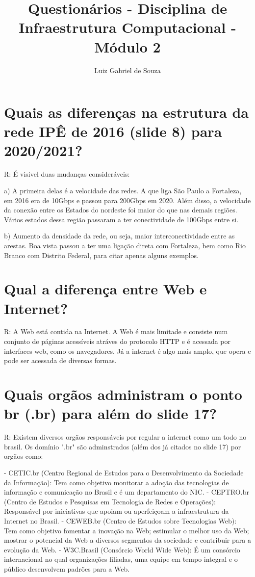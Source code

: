 \documentclass{article}
\title{Questionários - Disciplina de Infraestrutura Computacional - Módulo 2}
\author{Luiz Gabriel de Souza}
\begin{document}
\maketitle


\section{Quais as diferenças na estrutura da rede IPÊ de 2016 (slide 8) para 2020/2021?}
R: É visivel duas mudanças consideráveis:

a) A primeira delas é a velocidade das redes. A que liga São Paulo a Fortaleza, em 2016 era de 10Gbps e passou para 200Gbps em 2020. 
Além disso, a velocidade da conexão entre os Estados do nordeste foi maior do que nas demais regiões. Vários estados dessa região passaram a ter conectividade de 100Gbps entre si.

b) Aumento da densidade da rede, ou seja, maior interconectividade entre as arestas. Boa vista passou a ter uma ligação direta com Fortaleza, bem como Rio Branco com Distrito Federal, para citar apenas alguns exemplos.

\section{Qual a diferença entre Web e Internet?}
R: A Web está contida na Internet. A Web é mais limitade e consiste num conjunto de páginas acessíveis atráves do protocolo HTTP e é acessada por interfaces web, como os navegadores. 
Já a internet é algo mais amplo, que opera e pode ser acessada de diversas formas.

\section{Quais orgãos administram o ponto br (.br) para além do slide 17?}

R: Existem diversos orgãos responsáveis por regular a internet como um todo no brasil. Os domínio ".br" são adminstrados (além dos já citados no slide 17) por orgãos como:

- CETIC.br (Centro Regional de Estudos para o Desenvolvimento da Sociedade da Informação): Tem como objetivo monitorar a adoção das tecnologias de informação e comunicação no Brasil e é um departamento do NIC.
- CEPTRO.br (Centro de Estudos e Pesquisas em Tecnologia de Redes e Operações): Responsável por iniciativas que apoiam ou aperfeiçoam a infraestrutura da Internet no Brasil.
- CEWEB.br (Centro de Estudos sobre Tecnologias Web): Tem como objetivo fomentar a inovação na Web; estimular o melhor uso da Web; mostrar o potencial da Web a diversos segmentos da sociedade e contribuir para a evolução da Web.
- W3C.Brasil (Consórcio World Wide Web): É um consórcio internacional no qual organizações filiadas, uma equipe em tempo integral e o público desenvolvem padrões para a Web.
\end{document}
